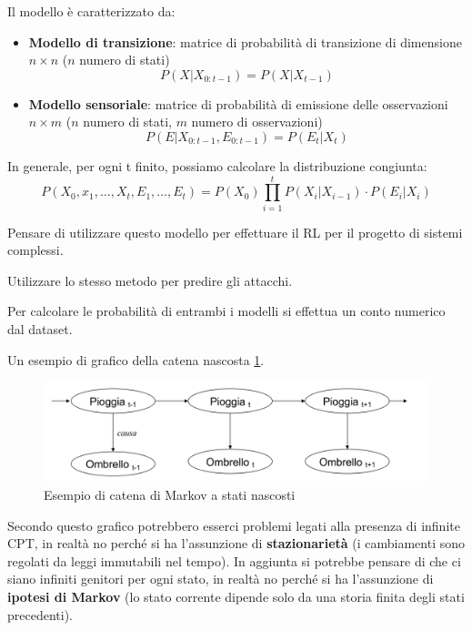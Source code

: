 Il modello è caratterizzato da:
\begin{itemize}
    \item \textbf{Modello di transizione}: matrice di probabilità di transizione
          di dimensione $n\times n$ ($n$ numero di stati)
          \begin{equation*}
              P(X | X_{0:t-1}) = P(X | X_{t-1})
          \end{equation*}
    \item \textbf{Modello sensoriale}: matrice di probabilità di emissione delle
          osservazioni  $n\times m$ ($n$ numero di stati, $m$ numero di osservazioni)
          \begin{equation*}
              P(E | X_{0:t-1}, E_{0:t-1}) = P(E_{t} | X_{t})
          \end{equation*}
\end{itemize}
In generale, per ogni t finito, possiamo calcolare la distribuzione congiunta:
\begin{equation}
    P(X_0, x_1,\dots,X_t, E_1,\dots, E_t) = P(X_0) \prod_{i=1}^{t}P(X_i|X_{i-1}) \cdot P(E_i|X_i)
\end{equation}
\begin{nota}
    Pensare di utilizzare questo modello per effettuare il RL per il progetto di
    sistemi complessi.

    Utilizzare lo stesso metodo per predire gli attacchi.
\end{nota}
\begin{nota}
    Per calcolare le probabilità di entrambi i modelli si effettua un conto
    numerico dal dataset.
\end{nota}
Un esempio di grafico della catena nascosta \ref{fig:HMM}.
\begin{figure}[!ht]
    \centering
    \includegraphics[width=.5\textwidth]{img/catene/hmm.png}
    \caption{Esempio di catena di Markov a stati nascosti}
    \label{fig:HMM}
\end{figure}

Secondo questo grafico potrebbero esserci problemi legati alla presenza di infinite
CPT, in realtà no perché si ha l'assunzione di \textbf{stazionarietà} (i cambiamenti
sono regolati da leggi immutabili nel tempo). In aggiunta si potrebbe pensare di
che ci siano infiniti genitori per ogni stato, in realtà no perché si ha l'assunzione
di \textbf{ipotesi di Markov} (lo stato corrente dipende solo da una storia finita
degli stati precedenti).

